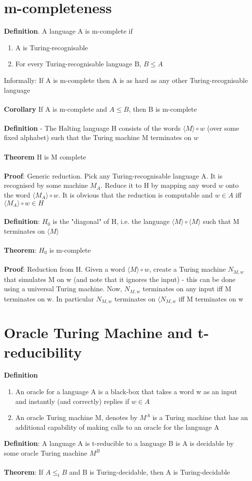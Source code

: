 \documentclass{article}[18pt]
\begin{document}
\section{m-completeness}
\textbf{Definition}. A language A is m-complete if
\begin{enumerate}
	\item A is Turing-recognisable
	\item For every Turing-recognisable language B, $B\leqslant A$
\end{enumerate}
Informally: If A is m-complete then A is as hard as any other Turing-recognisable language\\
\\
\textbf{Corollary} If A is m-complete and $A\leqslant B$, then B is m-complete\\
\\
\textbf{Definition} - The Halting language H consists of the words $\langle M \rangle \circ w$ (over some fixed alphabet) such that the Turing machine M terminates on $w$\\
\\
\textbf{Theorem} H is M complete\\
\\
\textbf{Proof}: Generic reduction. Pick any Turing-recognisable language A. It is recognised by some machine $M_A$. Reduce it to H by mapping any word $w$ onto the word $\langle M_A \rangle \circ w$. It is obvious that the reduction is computable and $w\in A$ iff $\langle M_A \rangle \circ w \in H$\\
\\
\textbf{Definition}: $H_0$ is the "diagonal" of H, i.e. the language $\langle M \rangle \circ \langle M \rangle$ such that M terminates on $\langle M \rangle$\\
\\
\textbf{Theorem}: $H_0$ is m-complete\\
\\
\textbf{Proof}: Reduction from H. Given a word $\langle M \rangle \circ w$, create a Turing machine $N_{M,w}$ that simulates M on w (and note that it ignores the input) - this can be done using a universal Turing machine. Now, $N_{M,w}$ terminates on any input iff M terminates on w. In particular $N_{M,w}$ terminates on $\langle N_{M,w}$ iff M terminates on w
\section{Oracle Turing Machine and t-reducibility}
\textbf{Definition}
\begin{enumerate}
	\item An oracle for a language A is a black-box that takes a word w as an input and instantly (and correctly) replies if $w\in A$
	\item An oracle Turing machine M, denotes by $M^A$ is a Turing machine that has an additional capability of making calls to an oracle for the language A
\end{enumerate}
\textbf{Definition}: A language A is t-reducible to a language B is A is decidable by some oracle Turing machine $M^B$\\
\\
\textbf{Theorem}: If $A\leqslant_t B$ and B is Turing-decidable, then A is Turing-decidable
\end{document}
